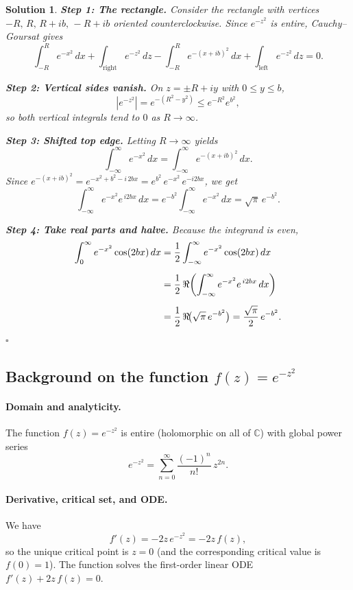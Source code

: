 \documentclass[11pt]{article}
\newtheorem{solution}{Solution}
\begin{document}
\begin{solution}
	\noindent\textbf{Step 1: The rectangle.}\;
	Consider the rectangle with vertices $-R,\,R,\,R+ib,\,-R+ib$ oriented counterclockwise. 
	Since $e^{-z^{2}}$ is entire, Cauchy--Goursat gives
	\[
	\int_{-R}^{R} e^{-x^{2}}\,dx
	+\int_{\text{right}} e^{-z^{2}}\,dz
	-\int_{-R}^{R} e^{-(x+ib)^{2}}\,dx
	+\int_{\text{left}} e^{-z^{2}}\,dz
	=0 .
	\]
	
	\medskip
	\noindent\textbf{Step 2: Vertical sides vanish.}\;
	On $z=\pm R+iy$ with $0\le y\le b$,
	\[
	|e^{-z^{2}}|=e^{-(R^{2}-y^{2})}\le e^{-R^{2}}e^{b^{2}},
	\]
	so both vertical integrals tend to $0$ as $R\to\infty$.
	
	\medskip
	\noindent\textbf{Step 3: Shifted top edge.}\;
	Letting $R\to\infty$ yields
	\[
	\int_{-\infty}^{\infty} e^{-x^{2}}\,dx
	=\int_{-\infty}^{\infty} e^{-(x+ib)^{2}}\,dx .
	\]
	Since $e^{-(x+ib)^{2}}=e^{-x^{2}+b^{2}-i\,2bx}
	= e^{b^{2}}\,e^{-x^{2}}\,e^{-i2bx}$, we get
	\[
	\int_{-\infty}^{\infty} e^{-x^{2}} e^{\,i2bx}\,dx
	= e^{-b^{2}} \int_{-\infty}^{\infty} e^{-x^{2}}\,dx
	= \sqrt{\pi}\,e^{-b^{2}} .
	\]
	
	\medskip
	\noindent\textbf{Step 4: Take real parts and halve.}\;
	Because the integrand is even,
	\[
	\setlength{\jot}{6pt}
	\begin{aligned}
		\int_{0}^{\infty} e^{-x^{2}}\cos(2bx)\,dx
		&= \frac{1}{2}\int_{-\infty}^{\infty} e^{-x^{2}}\cos(2bx)\,dx \\[2pt]
		&= \frac{1}{2}\,\Re\!\left(\int_{-\infty}^{\infty} e^{-x^{2}} e^{\,i2bx}\,dx\right) \\[2pt]
		&= \frac{1}{2}\,\Re\!\big(\sqrt{\pi}\,e^{-b^{2}}\big)
		= \frac{\sqrt{\pi}}{2}\,e^{-b^{2}} .
	\end{aligned}
	\]
	\hfill$\square$
\end{solution}

\subsection*{Background on the function $f(z)=e^{-z^{2}}$}

\paragraph{Domain and analyticity.}
The function $f(z)=e^{-z^{2}}$ is entire (holomorphic on all of $\mathbb C$) with global power series
\[
e^{-z^{2}}=\sum_{n=0}^{\infty}\frac{(-1)^n}{n!}\,z^{2n}.
\]

\paragraph{Derivative, critical set, and ODE.}
We have
\[
f'(z)=-2z\,e^{-z^{2}}=-2z\,f(z),
\]
so the unique critical point is $z=0$ (and the corresponding critical value is $f(0)=1$).
The function solves the first-order linear ODE $f'(z)+2z\,f(z)=0$.
\end{document}
